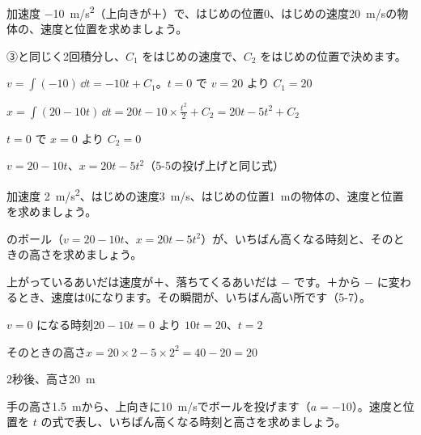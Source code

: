 \begin{reidai}[加速度から位置]
加速度 \qty{-10}{m/s^2}（上向きが＋）で、はじめの位置0、はじめの速度\qty{20}{m/s}の物体の、速度と位置を求めましょう。\par
\kangaekata ③と同じく2回積分し、$C_1$ をはじめの速度で、$C_2$ をはじめの位置で決めます。\par
\shiki $\displaystyle v=\int(-10)\,\dd t=-10t+C_1$。$t=0$ で $v=20$ より $C_1=20$\par
\hspace*{2.6\zw}$\displaystyle x=\int(20-10t)\,\dd t=20t-10\times\frac{t^2}{2}+C_2=20t-5t^2+C_2$\par
\hspace*{2.6\zw}$t=0$ で $x=0$ より $C_2=0$\par
\kotae $v=20-10t$、$x=20t-5t^2$（5-5の投げ上げと同じ式）
\end{reidai}

\begin{jibun}
加速度 \qty{2}{m/s^2}、はじめの速度\qty{3}{m/s}、はじめの位置\qty{1}{m}の物体の、速度と位置を求めましょう。
\end{jibun}

\begin{reidai}[いちばん高くなる所]
のボール（$v=20-10t$、$x=20t-5t^2$）が、いちばん高くなる時刻と、そのときの高さを求めましょう。\par
\kangaekata 上がっているあいだは速度が＋、落ちてくるあいだは $-$ です。＋から $-$ に変わるとき、速度は0になります。その瞬間が、いちばん高い所です（5-7）。\par
\shiki $v=0$ になる時刻\quad $20-10t=0$ より $10t=20$、$t=2$\par
\hspace*{2.6\zw}そのときの高さ\quad $x=20\times2-5\times2^2=40-20=20$\par
\kotae 2秒後、高さ\qty{20}{m}
\end{reidai}

\begin{jibun}
手の高さ\qty{1.5}{m}から、上向きに\qty{10}{m/s}でボールを投げます（$a=-10$）。速度と位置を $t$ の式で表し、いちばん高くなる時刻と高さを求めましょう。
\end{jibun}

